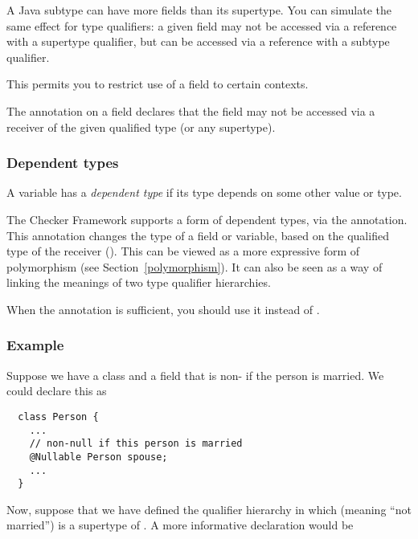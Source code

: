 A Java subtype can have more fields than its supertype.  You can simulate
the same effect for type qualifiers:  a given field may not be accessed via
a reference with a supertype qualifier, but can be accessed via a reference
with a subtype qualifier.

This permits you to restrict use of a field to certain contexts.

The  annotation
on a field declares that the field may not be accessed via a receiver of
the given qualified type (or any supertype).


\subsubsection{Dependent types\label{dependent-types}}

A variable has a \emph{dependent type} if its type depends on some other
value or type.

The Checker Framework supports a form of dependent types, via the
 annotation.
This annotation changes the type of a field or variable, based on the
qualified type of the receiver ().  This can be viewed as a more
expressive form of polymorphism (see Section~\ref{polymorphism}).  It can
also be seen as a way of linking the meanings of two type qualifier
hierarchies.

When the  annotation is sufficient, you
should use it instead of .


\subsubsection{Example\label{dependent-types-example}}

Suppose we have a class  and a field  that is
non- if the person is married.  We could declare this as

\begin{Verbatim}
  class Person {
    ...
    // non-null if this person is married
    @Nullable Person spouse;
    ...
  }
\end{Verbatim}

Now, suppose that we have defined the qualifier hierarchy in which 
 (meaning ``not married'') is a supertype of .
A more informative declaration would be

